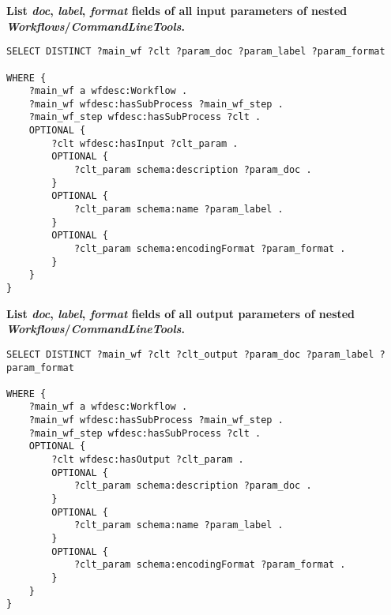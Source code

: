 \noindent
\textbf{List \emph{doc}, \emph{label}, \emph{format} fields of all input parameters of nested \emph{Workflows}/\emph{CommandLineTools}.}

\begin{verbatim}
SELECT DISTINCT ?main_wf ?clt ?param_doc ?param_label ?param_format

WHERE {
    ?main_wf a wfdesc:Workflow .
    ?main_wf wfdesc:hasSubProcess ?main_wf_step .
    ?main_wf_step wfdesc:hasSubProcess ?clt .
    OPTIONAL {
        ?clt wfdesc:hasInput ?clt_param .
        OPTIONAL {
            ?clt_param schema:description ?param_doc .
        }
        OPTIONAL {
            ?clt_param schema:name ?param_label .
        }
        OPTIONAL {
            ?clt_param schema:encodingFormat ?param_format .
        }
    }
}
\end{verbatim}

\noindent
\textbf{List \emph{doc}, \emph{label}, \emph{format} fields of all output parameters of nested \emph{Workflows}/\emph{CommandLineTools}.}

\begin{verbatim}
SELECT DISTINCT ?main_wf ?clt ?clt_output ?param_doc ?param_label ?param_format

WHERE {
    ?main_wf a wfdesc:Workflow .
    ?main_wf wfdesc:hasSubProcess ?main_wf_step .
    ?main_wf_step wfdesc:hasSubProcess ?clt .
    OPTIONAL {
        ?clt wfdesc:hasOutput ?clt_param .
        OPTIONAL {
            ?clt_param schema:description ?param_doc .
        }
        OPTIONAL {
            ?clt_param schema:name ?param_label .
        }
        OPTIONAL {
            ?clt_param schema:encodingFormat ?param_format .
        }
    }
}
\end{verbatim}
